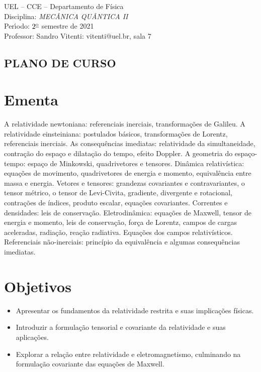 \documentclass[a4paper,12pt]{article}
\begin{document}
\large
\begin{flushleft}
	UEL -- CCE -- Departamento de Física\\
	Disciplina: {\em MECÂNICA QUÂNTICA II} \\
	Per\'{\i}odo: $2^{\rm \underline o}$ semestre de 2021\\
	Professor: Sandro Vitenti: vitenti@uel.br, sala 7
\end{flushleft}

\normalsize

\begin{center}
	\section*{PLANO DE CURSO}
\end{center}
\section{Ementa}

A relatividade newtoniana: referenciais inerciais, transformações de Galileu. A
relatividade einsteiniana: postulados básicos, transformações de Lorentz, referenciais
inerciais. As consequências imediatas: relatividade da simultaneidade, contração do
espaço e dilatação do tempo, efeito Doppler. A geometria do espaço-tempo: espaço de
Minkowski, quadrivetores e tensores. Dinâmica relativística: equações de movimento,
quadrivetores de energia e momento, equivalência entre massa e energia. Vetores e
tensores: grandezas covariantes e contravariantes, o tensor métrico, o tensor de
Levi-Civita, gradiente, divergente e rotacional, contrações de índices, produto escalar,
equações covariantes. Correntes e densidades: leis de conservação. Eletrodinâmica:
equações de Maxwell, tensor de energia e momento, leis de conservação, força de Lorentz,
campos de cargas aceleradas, radiação, reação radiativa. Equações dos campos
relativísticos. Referenciais não-inerciais: princípio da equivalência e algumas
consequências imediatas.


\section{Objetivos}

\begin{itemize}
	\item Apresentar os fundamentos da relatividade restrita e suas implicações físicas.
	\item Introduzir a formulação tensorial e covariante da relatividade e suas
	      aplicações.
	\item Explorar a relação entre relatividade e eletromagnetismo, culminando na
	      formulação covariante das equações de Maxwell.
\end{itemize}
\end{document}
